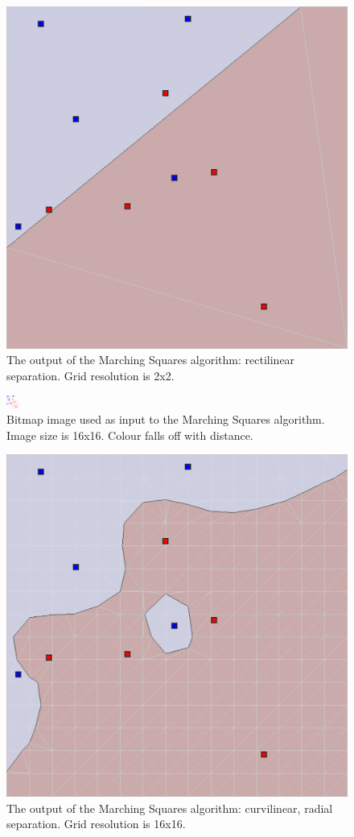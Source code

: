 \documentclass[12pt]{article}
\begin{document}
\begin{figure} 
\centering
  \includegraphics[width = 3 in]{2_res.png}
  \caption{The output of the Marching Squares algorithm: rectilinear separation. Grid resolution is 2x2.
}
\end{figure}






\begin{figure} 
\centering
  \includegraphics[width = 3 in]{16_res_image.png}
  \caption{Bitmap image used as input to the Marching Squares algorithm.
Image size is 16x16.
Colour falls off with distance.
}
\end{figure}


\begin{figure} 
\centering
  \includegraphics[width = 3 in]{16_res.png}
  \caption{The output of the Marching Squares algorithm: curvilinear, radial separation. Grid resolution is 16x16.
}
\end{figure}
\end{document}
